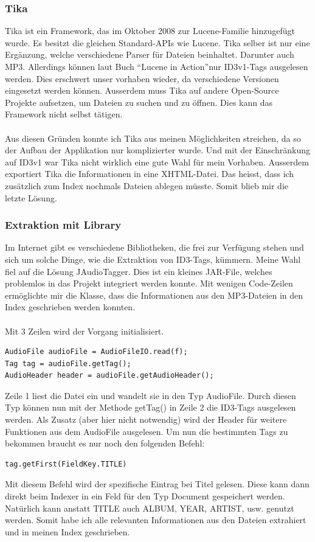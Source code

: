 \documentclass[12pt,a4paper,ngerman]{report}
\begin{document}
\subsubsection*{Tika}
Tika ist ein Framework, das im Oktober 2008 zur Lucene-Familie hinzugefügt wurde. Es besitzt die gleichen Standard-APIs wie Lucene. Tika selber ist nur eine Ergänzung, welche verschiedene Parser für Dateien beinhaltet. Darunter auch MP3. Allerdings können laut Buch \textquotedblleft Lucene in Action\textquotedblright nur ID3v1-Tags ausgelesen werden. Dies erschwert unser vorhaben wieder, da verschiedene Versionen eingesetzt werden können. Ausserdem muss Tika auf andere Open-Source Projekte aufsetzen, um Dateien zu suchen und zu öffnen. Dies kann das Framework nicht selbst tätigen.\\
\\
Aus diesen Gründen konnte ich Tika aus meinen Möglichkeiten streichen, da so der Aufbau der Applikation nur komplizierter wurde. Und mit der Einschränkung auf ID3v1 war Tika nicht wirklich eine gute Wahl für mein Vorhaben. Ausserdem exportiert Tika die Informationen in eine XHTML-Datei. Das heisst, dass ich zusätzlich zum Index nochmals Dateien ablegen müsste. Somit blieb mir die letzte Lösung.
\subsubsection*{Extraktion mit Library}
Im Internet gibt es verschiedene Bibliotheken, die frei zur Verfügung stehen und sich um solche Dinge, wie die Extraktion von ID3-Tags, kümmern. Meine Wahl fiel auf die Lösung JAudioTagger. Dies ist ein kleines JAR-File, welches problemlos in das Projekt integriert werden konnte. Mit wenigen Code-Zeilen ermöglichte mir die Klasse, dass die Informationen aus den MP3-Dateien in den Index geschrieben werden konnten.
\\
\\
Mit 3 Zeilen wird der Vorgang initialisiert. 
\begin{lstlisting}
AudioFile audioFile = AudioFileIO.read(f);
Tag tag = audioFile.getTag();
AudioHeader header = audioFile.getAudioHeader();
\end{lstlisting}
Zeile 1 liest die Datei ein und wandelt sie in den Typ AudioFile. Durch diesen Typ können nun mit der Methode getTag() in Zeile 2 die ID3-Tags ausgelesen werden. Als Zusatz (aber hier nicht notwendig) wird der Header für weitere Funktionen aus dem AudioFile ausgelesen. Um nun die bestimmten Tags zu bekommen braucht es nur noch den folgenden Befehl:
\begin{lstlisting}
tag.getFirst(FieldKey.TITLE)
\end{lstlisting}
Mit diesem Befehl wird der spezifische Eintrag bei Titel gelesen. Diese kann dann direkt beim Indexer in ein Feld für den Typ Document gespeichert werden. Natürlich kann anstatt TITLE auch ALBUM, YEAR, ARTIST, usw. genutzt werden. Somit habe ich alle relevanten Informationen aus den Dateien extrahiert und in meinen Index geschrieben.
\newpage
\end{document}
